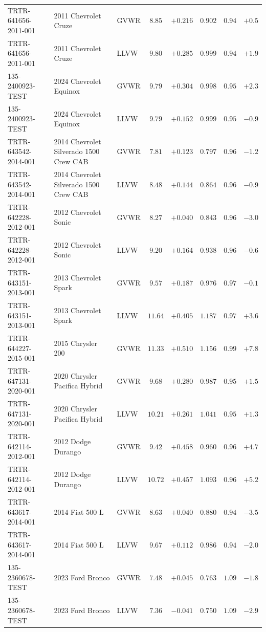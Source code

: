\documentclass[12pt, twoside]{amsart}
\theoremstyle{definition}
\begin{document}
{\begin{longtable}{lp{2.9cm}lccccc}
TRTR-641656-2011-001 & 2011 Chevrolet Cruze & GVWR & $8.85$ & $+0.216$ & $0.902$ & $0.94$ & $+0.5$\\
TRTR-641656-2011-001 & 2011 Chevrolet Cruze & LLVW & $9.80$ & $+0.285$ & $0.999$ & $0.94$ & $+1.9$\\
135-2400923-TEST & 2024 Chevrolet Equinox & GVWR & $9.79$ & $+0.304$ & $0.998$ & $0.95$ & $+2.3$\\
135-2400923-TEST & 2024 Chevrolet Equinox & LLVW & $9.79$ & $+0.152$ & $0.999$ & $0.95$ & $-0.9$\\
TRTR-643542-2014-001 & 2014 Chevrolet Silverado 1500 Crew CAB & GVWR & $7.81$ & $+0.123$ & $0.797$ & $0.96$ & $-1.2$\\
TRTR-643542-2014-001 & 2014 Chevrolet Silverado 1500 Crew CAB & LLVW & $8.48$ & $+0.144$ & $0.864$ & $0.96$ & $-0.9$\\
TRTR-642228-2012-001 & 2012 Chevrolet Sonic & GVWR & $8.27$ & $+0.040$ & $0.843$ & $0.96$ & $-3.0$\\
TRTR-642228-2012-001 & 2012 Chevrolet Sonic & LLVW & $9.20$ & $+0.164$ & $0.938$ & $0.96$ & $-0.6$\\
TRTR-643151-2013-001 & 2013 Chevrolet Spark & GVWR & $9.57$ & $+0.187$ & $0.976$ & $0.97$ & $-0.1$\\
TRTR-643151-2013-001 & 2013 Chevrolet Spark & LLVW & $11.64$ & $+0.405$ & $1.187$ & $0.97$ & $+3.6$\\
TRTR-644227-2015-001 & 2015 Chrysler 200 & GVWR & $11.33$ & $+0.510$ & $1.156$ & $0.99$ & $+7.8$\\
TRTR-647131-2020-001 & 2020 Chrysler Pacifica Hybrid & GVWR & $9.68$ & $+0.280$ & $0.987$ & $0.95$ & $+1.5$\\
TRTR-647131-2020-001 & 2020 Chrysler Pacifica Hybrid & LLVW & $10.21$ & $+0.261$ & $1.041$ & $0.95$ & $+1.3$\\
TRTR-642114-2012-001 & 2012 Dodge Durango & GVWR & $9.42$ & $+0.458$ & $0.960$ & $0.96$ & $+4.7$\\
TRTR-642114-2012-001 & 2012 Dodge Durango & LLVW & $10.72$ & $+0.457$ & $1.093$ & $0.96$ & $+5.2$\\
TRTR-643617-2014-001 & 2014 Fiat 500 L & GVWR & $8.63$ & $+0.040$ & $0.880$ & $0.94$ & $-3.5$\\
TRTR-643617-2014-001 & 2014 Fiat 500 L & LLVW & $9.67$ & $+0.112$ & $0.986$ & $0.94$ & $-2.0$\\
135-2360678-TEST & 2023 Ford Bronco & GVWR & $7.48$ & $+0.045$ & $0.763$ & $1.09$ & $-1.8$\\
135-2360678-TEST & 2023 Ford Bronco & LLVW & $7.36$ & $-0.041$ & $0.750$ & $1.09$ & $-2.9$\\

\end{longtable}}
\end{document}
